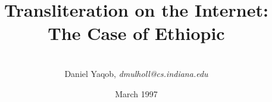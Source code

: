 \documentclass[twocolumn,a4paper]{article}
\begin{document}
\title{Transliteration on the Internet: The Case of Ethiopic}

\author{ {\Washra {} \  \ 
                   } \\
         Daniel Yaqob, \emph{dmulholl@cs.indiana.edu} }

\date{March 1997}


\maketitle
\thispagestyle{empty}


\onecolumn

\onecolumn


\end{document}
